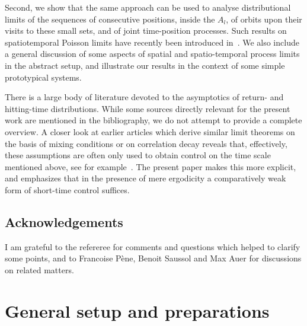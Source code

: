 \documentclass[AHL,Unicode,longabstracts]{cedram}
\begin{document}
Second, we show that the same approach can be used to analyse distributional limits of the sequences of consecutive positions, inside the $A_{l}$, of orbits upon their visits to these small sets, and of joint time-position processes. Such results on spatiotemporal Poisson limits have recently been introduced in~\cite{PS2}. We also include a general discussion of some aspects of spatial and spatio-temporal process limits in the abstract setup, and illustrate our results in the context of some simple prototypical systems.



There is a large body of literature devoted to the asymptotics of return- and hitting-time distributions. While some sources directly relevant for the present work are mentioned in the bibliography, we do not attempt to provide a complete overview. A closer look at earlier articles which derive similar limit theorems on the basis of mixing conditions or on correlation decay reveals that, effectively, these assumptions are often only used to obtain control on the time scale mentioned above, see for example~\cite{Ab,AS,CC,FFT1,HP,HY,PS,PS2}. The present paper makes this more explicit, and emphasizes that in the presence of mere ergodicity a comparatively weak form of short-time control suffices.

\subsection*{Acknowledgements}
I am grateful to the refereree for comments and questions which helped to clarify some points, and to Francoise Pène, Benoit Saussol and Max Auer for discussions on related matters.



\section{General setup and preparations}
\end{document}
